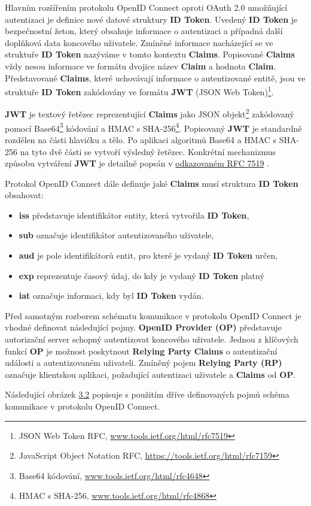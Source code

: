 \documentclass[
  printed, %
  twoside, %
  table,   %
  nolof,     %
  nolot,     %
]{fithesis3}
\begin{document}
Hlavním rozšířením protokolu OpenID Connect oproti OAuth 2.0 umožňující autentizaci je definice nové datové struktury \textbf{ID Token}. Uvedený \textbf{ID Token} je bezpečnostní žeton, který obsahuje informace o autentizaci a případná další doplňková data koncového uživatele. Zmíněné informace nacházející se ve struktuře \textbf{ID Token} nazýváme v tomto kontextu \textbf{Claims}. Popisované \textbf{Claims} vždy nesou informace ve formátu dvojice název \textbf{Claim} a hodnota \textbf{Claim}. Představované \textbf{Claims}, které uchovávají informace o autentizované entitě, jsou ve struktuře \textbf{ID Token} zakódovány ve formátu \textbf{JWT} (JSON Web Token)\footnote{JSON Web Token RFC, \url{www.tools.ietf.org/html/rfc7519}}.    \par

\textbf{JWT} je textový řetězec reprezentující \textbf{Claims} jako JSON objekt\footnote{JavaScript Object Notation RFC, \url{https://tools.ietf.org/html/rfc7159}} zakódovaný pomocí Base64\footnote{Base64 kódování, \url{www.tools.ietf.org/html/rfc4648}} kódování a HMAC s SHA-256\footnote{HMAC s SHA-256, \url{ www.tools.ietf.org/html/rfc4868}}.  Popisovaný \textbf{JWT} je standardně rozdělen na části hlavičku a tělo. Po aplikaci algoritmů Base64 a HMAC s SHA-256 na tyto dvě části se vytvoří výsledný řetězec. Konkrétní mechanizmus způsobu vytváření \textbf{JWT} je detailně popsán v \href{http://www.tools.ietf.org/html/rfc7519}{odkazovaném RFC 7519} . \par

Protokol OpenID Connect dále definuje jaké \textbf{Claims} musí struktura \textbf{ID Token} obsahovat:

\begin{itemize}
    \item \textbf{iss} představuje identifikátor entity, která vytvořila \textbf{ID Token}, 
    \item \textbf{sub} označuje identifikátor autentizovaného uživatele, 
    \item \textbf{aud} je pole identifikátorů entit, pro které je vydaný \textbf{ID Token} určen,
    \item \textbf{exp} reprezentuje časový údaj, do kdy je vydaný \textbf{ID Token} platný
    \item \textbf{iat} označuje informaci, kdy byl \textbf{ID Token} vydán.
\end{itemize}
\par

Před samotným rozborem schématu komunikace v protokolu OpenID Connect je vhodné definovat následující pojmy. \textbf{OpenID Provider (OP)} představuje autorizační server schopný autentizovat koncového uživatele. Jednou z klíčových funkcí \textbf{OP} je možnost poskytnout \textbf{Relying Party} \textbf{Claims} o autentizační události a autentizovaném uživateli. Zmíněný pojem \textbf{Relying Party (RP)} označuje klientskou aplikaci, požadující autentizaci uživatele a \textbf{Claims} od \textbf{OP}. \par
Následující obrázek \hyperref[fig:oidc]{3.2} popisuje s použitím dříve definovaných pojmů schéma komunikace v protokolu OpenID Connect.
\end{document}
